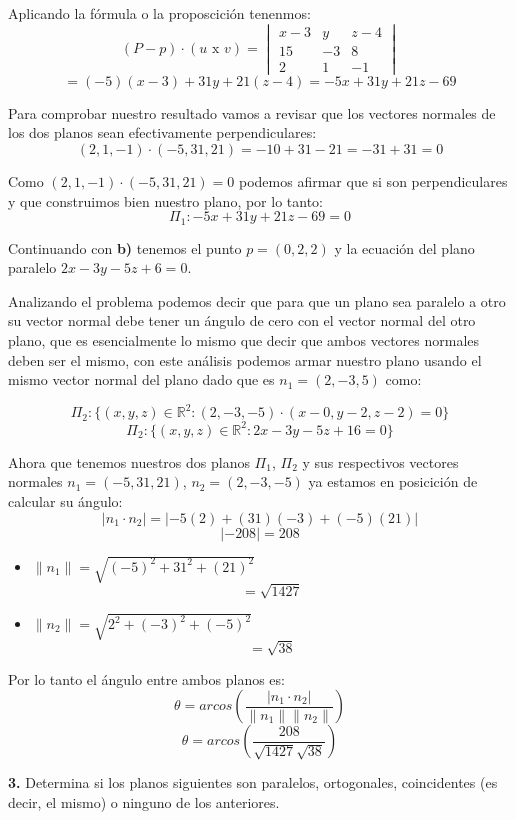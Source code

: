 \documentclass{article}
\begin{document}
Aplicando la fórmula o la proposcición tenenmos:
$$(P-p)\cdot(u \text{ x } v) = \begin{vmatrix}
    x-3 & y &  z-4 \\
    15 & -3 & 8 \\
    2 & 1 & -1 
\end{vmatrix}$$
$$=(-5)(x-3)+31y+21(z-4) = -5x+31y+21z-69 $$

Para comprobar nuestro resultado vamos a revisar que los vectores normales de los dos planos sean efectivamente perpendiculares: 
$$(2,1,-1)\cdot (-5,31,21) = -10+31-21 = -31+31 = 0$$

Como $(2,1,-1)\cdot (-5,31,21) = 0 $ podemos afirmar que si son perpendiculares y que construimos bien nuestro plano, por lo tanto:
$$\Pi_1 : -5x+31y+21z-69 = 0$$

Continuando con \textbf{b)} tenemos el punto $p = (0,2,2)$ y la ecuación del plano paralelo $2x - 3y - 5z + 6 = 0$.

Analizando el problema podemos decir que para que un plano sea paralelo a otro su vector normal debe tener un ángulo de cero con el vector normal del otro plano, que es esencialmente 
lo mismo que decir que ambos vectores normales deben ser el mismo, con este análisis podemos armar nuestro plano usando el mismo vector normal del plano dado que es $n_1 =(2,-3,5)$ como:

$$\Pi_2 : \{(x,y,z) \in \mathbb{R}^2: (2,-3,-5)\cdot (x-0, y-2, z-2 )=0\}$$
$$\Pi_2: \{(x,y,z) \in \mathbb{R}^2: 2x -3y-5z+16 = 0\}$$

Ahora que tenemos nuestros dos planos $\Pi_1$, $\Pi_2$ y sus respectivos vectores normales $n_1 =(-5,31,21)$, $n_2=(2,-3,-5)$ ya estamos en posicición de calcular su ángulo:
$$\left| n_1 \cdot n_2\right| = \left|-5(2)+(31)(-3)+(-5)(21)\right|$$
$$\left|-208\right| = 208$$
\begin{itemize}
    \item$\|n_1\| = \sqrt{(-5)^2+31^2+(21)^2}$
    $$=\sqrt{1427}$$
    \item $\|n_2\| = \sqrt{2^2+(-3)^2+(-5)^2}$
    $$= \sqrt{38}$$
\end{itemize}

Por lo tanto el ángulo entre ambos planos es: 
$$\theta = arcos\left(\frac{\left|n_1\cdot n_2\right|}{\|n_1\|\|n_2\|}\right)$$
$$\theta = arcos\left(\frac{208}{\sqrt{1427}\sqrt{38}}\right)$$
\vspace*{10pt}

\textbf{3.} Determina si los planos siguientes son paralelos, ortogonales, coincidentes (es decir, el
mismo) o ninguno de los anteriores.
\vspace{10pt}
\end{document}
